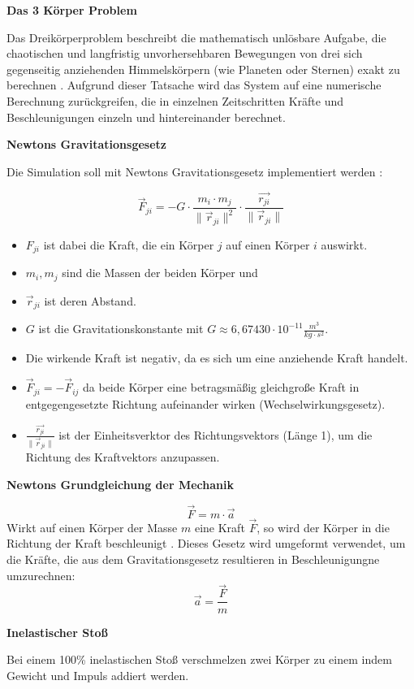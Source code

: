 \documentclass[11pt]{article}
\providecommand{\tightlist}{%
      \setlength{\itemsep}{0pt}\setlength{\parskip}{0pt}}
\begin{document}
\textbf{Das 3 Körper Problem}

Das Dreikörperproblem beschreibt die mathematisch unlösbare Aufgabe, die
chaotischen und langfristig unvorhersehbaren Bewegungen von drei sich
gegenseitig anziehenden Himmelskörpern (wie Planeten oder Sternen) exakt
zu berechnen \cite{quelle2}. Aufgrund dieser Tatsache wird das System auf eine
numerische Berechnung zurückgreifen, die in einzelnen Zeitschritten
Kräfte und Beschleunigungen einzeln und hintereinander berechnet.

\textbf{Newtons Gravitationsgesetz}

Die Simulation soll mit Newtons Gravitationsgesetz implementiert werden
\cite{quelle1}:

\[
\vec{F}_{ji} = -G \cdot \frac{m_i \cdot m_j}{\|\vec{r}_{ji}\|^2} \cdot \frac{\vec{r_{ji}}}{\|\vec{r}_{ji}\|}
\]

\begin{itemize}
\tightlist
\item
  \(F_{ji}\) ist dabei die Kraft, die ein Körper \(j\) auf einen Körper
  \(i\) auswirkt.
\item
  \(m_i, m_j\) sind die Massen der beiden Körper und
\item
  \(\vec{r}_{ji}\) ist deren Abstand.
\item
  \(G\) ist die Gravitationskonstante mit
  \(G\approx 6,67430\cdot 10^{-11}\frac{m^3}{kg\cdot s^2}\).
\item
  Die wirkende Kraft ist negativ, da es sich um eine anziehende Kraft
  handelt.
\item
  \(\vec{F}_{ji} = -\vec{F}_{ij}\) da beide Körper eine betragsmäßig
  gleichgroße Kraft in entgegengesetzte Richtung aufeinander wirken
  (Wechselwirkungsgesetz).
\item
  \(\frac{\vec{r_{ji}}}{\|\vec{r}_{ji}\|}\) ist der Einheitsverktor des
  Richtungsvektors (Länge 1), um die Richtung des Kraftvektors
  anzupassen.
\end{itemize}

\textbf{Newtons Grundgleichung der Mechanik}

\[
\vec{F} = m \cdot \vec{a}
\] Wirkt auf einen Körper der Masse \(m\) eine Kraft \(\vec{F}\), so
wird der Körper in die Richtung der Kraft beschleunigt \cite{quelle4}. Dieses
Gesetz wird umgeformt verwendet, um die Kräfte, die aus dem
Gravitationsgesetz resultieren in Beschleunigungne umzurechnen: \[
    \vec a = \frac{\vec F}{m}
\]

\textbf{Inelastischer Stoß}

Bei einem 100\% inelastischen Stoß verschmelzen zwei Körper zu einem
indem Gewicht und Impuls addiert werden.
\end{document}
